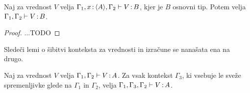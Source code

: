 \begin{lema}\label{lem:tovor-osnovni-tip-skrcitev}
	Naj za vrednost $V$ velja $\Gamma_1, x \mathinner{:} \langle A \rangle, \Gamma_2 \vdash V \mathinner{:} B$, kjer je $B$ osnovni tip. Potem velja $\Gamma_1, \Gamma_2 \vdash V \mathinner{:} B$.
\end{lema}

\begin{proof}
	...TODO
\end{proof}

Sledeči lemi o šibitvi konteksta za vrednosti in izračune se nanašata ena na drugo.

\begin{lema}\label{lem:weakening-values}
	Naj za vrednost $V$ velja $\Gamma_1, \Gamma_2 \vdash V \mathinner{:} A$. Za vsak kontekst $\Gamma_3$, ki vsebuje le sveže spremenljivke glede na $\Gamma_1$ in $\Gamma_2$, velja $\Gamma_1, \Gamma_3, \Gamma_2 \vdash V \mathinner{:} A$.
\end{lema}

